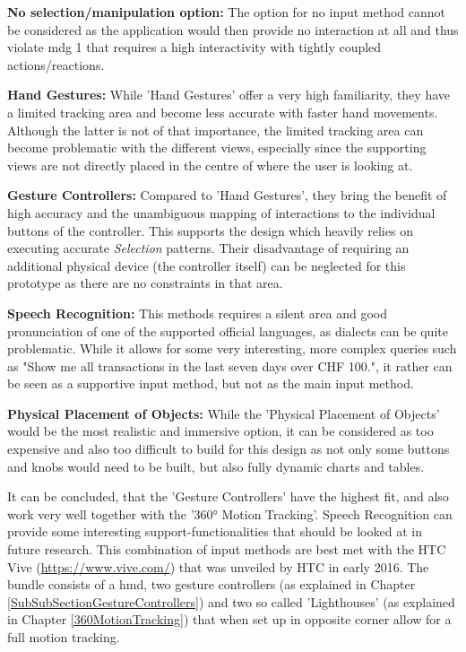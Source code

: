 \textbf{No selection/manipulation option:}
The option for no input method cannot be considered as the application would then provide no interaction at all and thus violate \gls{mdg} 1 that requires a high interactivity with tightly coupled actions/reactions.

\textbf{Hand Gestures:}
While 'Hand Gestures' offer a very high familiarity, they have a limited tracking area and become less accurate with faster hand movements. Although the latter is not of that importance, the limited tracking area can become problematic with the different views, especially since the supporting views are not directly placed in the centre of where the user is looking at.

\textbf{Gesture Controllers:}
Compared to 'Hand Gestures', they bring the benefit of high accuracy and the unambiguous mapping of interactions to the individual buttons of the controller. This supports the design which heavily relies on executing accurate \textit{Selection} patterns. Their disadvantage of requiring an additional physical device (the controller itself) can be neglected for this prototype as there are no constraints in that area.

\textbf{Speech Recognition:}
This methods requires a silent area and good pronunciation of one of the supported official languages, as dialects can be quite problematic. While it allows for some very interesting, more complex queries such as "Show me all transactions in the last seven days over CHF 100.", it rather can be seen as a supportive input method, but not as the main input method.

\textbf{Physical Placement of Objects:}
While the 'Physical Placement of Objects' would be the most realistic and immersive option, it can be considered as too expensive and also too difficult to build for this design as not only some buttons and knobs would need to be built, but also fully dynamic charts and tables.


It can be concluded, that the 'Gesture Controllers' have the highest fit, and also work very well together with the '360° Motion Tracking'. Speech Recognition can provide some interesting support-functionalities that should be looked at in future research. \newline
This combination of input methods are best met with the HTC Vive (\url{https://www.vive.com/}) that was unveiled by HTC in early 2016. The bundle consists of a \gls{hmd}, two gesture controllers (as explained in Chapter \ref{SubSubSectionGestureControllers}) and two so called 'Lighthouses' (as explained in Chapter \ref{360MotionTracking}) that when set up in opposite corner allow for a full motion tracking.


